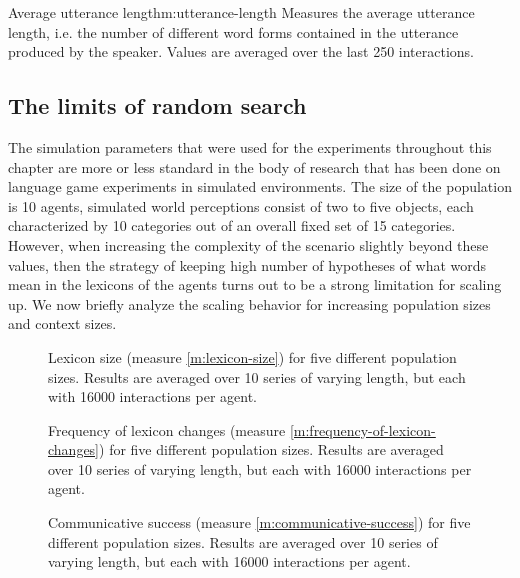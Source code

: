 \begin{measure}[t]{Average utterance length}{m:utterance-length}
  Measures the average utterance length, i.e. the number of different
  word forms contained in the utterance produced by the
  speaker. Values are averaged over the last 250 interactions.
\end{measure}


\subsection{The limits of random search}
\label{s:sgg-mv-structured-scaling}

The simulation parameters that were used for the experiments
throughout this chapter are more or less standard in the body of
research that has been done on language game experiments in simulated
environments. The size of the population is 10 agents, simulated world
perceptions consist of two to five objects, each characterized by 10
categories out of an overall fixed set of 15 categories. However, when
increasing the complexity of the scenario slightly beyond these
values, then the strategy of keeping high number of hypotheses of what
words mean in the lexicons of the agents turns out to be a strong
limitation for scaling up. We now briefly analyze the scaling behavior
for increasing population sizes and context sizes.


\startfiguregroup

\begin{figure}[p]
  \caption{Lexicon size (measure \ref{m:lexicon-size}) for five
    different population sizes. Results are averaged over 10 series of
    varying length, but each with 16000 interactions per agent.}
  \label{f:sgg-mw-structured-best-best-population-size-vs-lexicon-size}
\end{figure}


\begin{figure}[p]
  \caption{Frequency of lexicon changes (measure
    \ref{m:frequency-of-lexicon-changes}) for five different population
    sizes. Results are averaged over 10 series of varying length, but
    each with 16000 interactions per agent.}
  \label{f:sgg-mw-structured-best-best-population-size-vs-lexicon-changes}
\end{figure}


\begin{figure}[p]
  \caption{Communi\-cative success (measure
    \ref{m:communicative-success}) for five different population
    sizes. Results are averaged over 10 series of varying length, but
    each with 16000 interactions per agent.}
  \label{f:sgg-mw-structured-best-best-population-size-vs-communicative-success}
\end{figure}

